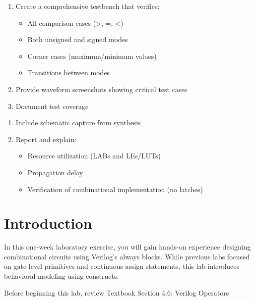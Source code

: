 \documentclass[12pt]{labmanual}
\begin{document}
\begin{questionssection}
\begin{question}[Verification]
\begin{enumerate}
    \item Create a comprehensive testbench that verifies:
    \begin{itemize}
        \item All comparison cases (>, =, <)
        \item Both unsigned and signed modes
        \item Corner cases (maximum/minimum values)
        \item Transitions between modes
    \end{itemize}
    \item Provide waveform screenshots showing critical test cases
    \item Document test coverage
\end{enumerate}
\end{question}

\begin{question}
\begin{enumerate}
    \item Include schematic capture from synthesis
    \item Report and explain:
    \begin{itemize}
        \item Resource utilization (LABs and LEs/LUTs)
        \item Propagation delay
        \item Verification of combinational implementation (no latches)
    \end{itemize}
\end{enumerate}
\end{question}
\end{questionssection}

\clearpage
\setcounter{questioncounter}{0}
\section{Introduction}

In this one-week laboratory exercise, you will gain hands-on experience designing combinational circuits using Verilog's always blocks. While previous labs focused on gate-level primitives and continuous assign statements, this lab introduces behavioral modeling using  constructs.

\begin{extra}
Before beginning this lab, review Textbook Section 4.6: Verilog Operators
\end{extra}
\end{document}

